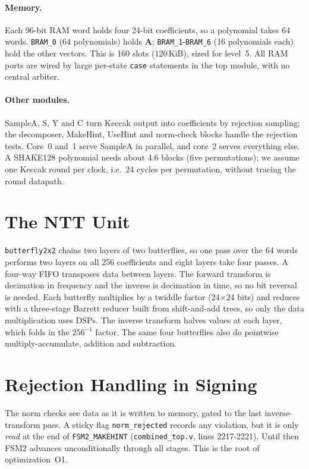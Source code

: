 \documentclass[12pt,a4paper]{report}
\newcommand{\code}[1]{\texttt{#1}}
\begin{document}
\paragraph{Memory.}
Each 96-bit RAM word holds four 24-bit coefficients, so a polynomial takes 64 words. \code{BRAM\_0} (64 polynomials) holds $\mathbf{A}$; \code{BRAM\_1}-\code{BRAM\_6} (16 polynomials each) hold the other vectors. This is 160 slots (120\,KiB), sized for level~5. All RAM ports are wired by large per-state \code{case} statements in the top module, with no central arbiter.

\paragraph{Other modules.}
SampleA, S, Y and C turn Keccak output into coefficients by rejection sampling; the decomposer, MakeHint, UseHint and norm-check blocks handle the rejection tests. Core~0 and~1 serve SampleA in parallel, and core~2 serves everything else. A SHAKE128 polynomial needs about 4.6 blocks (five permutations); we assume one Keccak round per clock, i.e.\ 24 cycles per permutation, without tracing the round datapath.

\section{The NTT Unit}
\code{butterfly2x2} chains two layers of two butterflies, so one pass over the 64 words performs two layers on all 256 coefficients and eight layers take four passes. A four-way FIFO transposes data between layers. The forward transform is decimation in frequency and the inverse is decimation in time, so no bit reversal is needed. Each butterfly multiplies by a twiddle factor (24$\times$24 bits) and reduces with a three-stage Barrett reducer built from shift-and-add trees, so only the data multiplication uses DSPs. The inverse transform halves values at each layer, which folds in the $256^{-1}$ factor. The same four butterflies also do pointwise multiply-accumulate, addition and subtraction.

\section{Rejection Handling in Signing}\label{sec:reject}
The norm checks see data as it is written to memory, gated to the last inverse-transform pass. A sticky flag \code{norm\_rejected} records any violation, but it is only \emph{read} at the end of \code{FSM2\_MAKEHINT} (\code{combined\_top.v}, lines 2217-2221). Until then FSM2 advances unconditionally through all stages. This is the root of optimization~O1.
\end{document}
